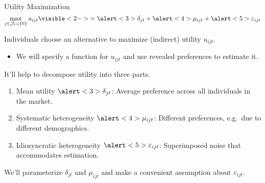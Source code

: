 \documentclass[aspectratio=169,t,11pt,table]{beamer}
\begin{document}
\begin{frame}{Utility Maximization}
    \vspace{-1.25\baselineskip}
    \begin{equation*}
        \max_{j \in \mathcal{J}_t \cup \{0\}} u_{ijt} \visible<2->{= \alert<3>{\delta_{jt}} + \alert<4>{\mu_{ijt}} + \alert<5>{\varepsilon_{ijt}}}
    \end{equation*}
    \vspace{-0.5\baselineskip}
    \begin{wideitemize}
        \item Individuals choose an alternative to maximize (indirect) utility $u_{ijt}$.
        \begin{itemize}
            \item We will specify a function for $u_{ijt}$ and use revealed preferences to estimate it.
        \end{itemize}
        \pause
        \item It'll help to decompose utility into three parts.
        \pause
        \begin{enumerate}
            \item Mean utility $\alert<3>{\delta_{jt}}$: Average preference across all individuals in the market.
            \pause
            \item Systematic heterogeneity $\alert<4>{\mu_{ijt}}$: Different preferences, e.g.\ due to different demographics.
            \pause
            \item Idiosyncratic heterogeneity $\alert<5>{\varepsilon_{ijt}}$: Superimposed noise that accommodates estimation.
        \end{enumerate}
        \pause
        \item We'll parameterize $\delta_{jt}$ and $\mu_{ijt}$ and make a convenient assumption about $\varepsilon_{ijt}$.
    \end{wideitemize}
\end{frame}
\end{document}
